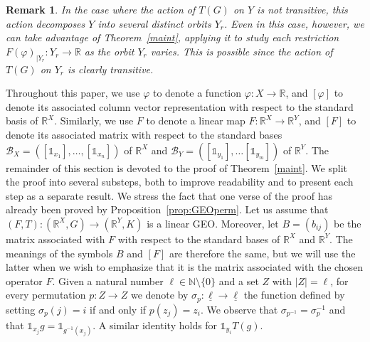 \documentclass[11pt]{article}
\newcommand{\R}{\mathbb{R}}
\newcommand{\p}{\varphi}
\newcommand{\pat}[1]{\todo[author=Patrizio]{#1}}
\newtheorem{rem}[theorem]{Remark}
\begin{document}
\begin{rem}
In the case where the action of $T(G)$ on $Y$ is not transitive, 
this action decomposes $Y$ into several distinct orbits $Y_r$.
Even in this case, however, we can take advantage of Theorem~\ref{maint}, applying it to study each restriction $F(\p)_{\vert Y_r}:Y_r\to\R$ as the orbit $Y_r$ varies. This is possible since the action of $T(G)$ on $Y_r$ is clearly transitive.
\end{rem}

Throughout this paper, we use $\varphi$ to denote a function
$\varphi : X \to \mathbb{R}$, and $[\varphi]$ to denote its associated column
vector representation with respect to the standard basis of $\mathbb{R}^X$.
Similarly, we use $F$ to denote a linear map
$F : \mathbb{R}^X \to \mathbb{R}^Y$, and $[F]$ to denote its associated matrix
with respect to the standard bases $\mathcal{B}_X=([{\mathds{1}}_{x_1}],\ldots,[{\mathds{1}}_{x_n}])$ of $\R^X$ and $\mathcal{B}_Y=([{\mathds{1}}_{y_1}],\ldots [{\mathds{1}}_{y_m}])$ of $\R^Y$. The remainder of this section is devoted to the proof of Theorem~\ref{maint}.
We split the proof into several substeps, both to improve readability and to
present each step as a separate result. We stress the fact that one verse of the proof has already been proved by Proposition~\ref{prop:GEOperm}. Let us assume that $(F,T) \colon (\R^X,G) \to (\R^Y,K)$ is a linear GEO. Moreover, let $B=(b_{ij})$ be the matrix
associated with $F$ with respect to the standard bases of $\R^X$ and $\R^Y$. The meanings of the symbols \(B\) and \([F]\) are therefore the same, but we will use the latter when we wish to emphasize that it is the matrix associated with the chosen operator \(F\). Given a natural number \(\ell \in \mathbb{N} \setminus \{0\}\) and a set \(Z\) with \(\lvert Z \rvert = \ell\), for every permutation \(p \colon Z \to Z\) we denote by \(\sigma_p \colon \underline{\ell} \to \underline{\ell}\) the function defined by setting \(\sigma_p(j) = i\) if and only if \(p(z_j) = z_i\). We observe that \(\sigma_{p^{-1}} = \sigma_p^{-1}\) and that
$\mathds{1}_{x_j} g = \mathds{1}_{g^{-1}(x_j)}$.
A similar identity holds for \(\mathds{1}_{y_i} T(g)\).
\end{document}
